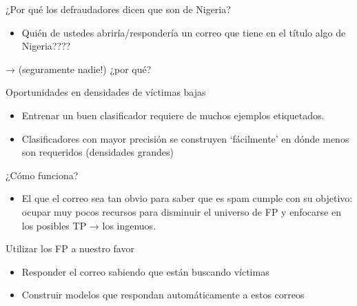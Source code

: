 \documentclass[ignorenonframetext,]{beamer}
\begin{document}
\begin{frame}{¿Por qué los defraudadores dicen que son de Nigeria?}

\begin{itemize}
\itemsep1pt\parskip0pt
\item
  Quién de ustedes abriría/respondería un correo que tiene en el título
  algo de Nigeria????
\end{itemize}

→ (seguramente nadie!) ¿por qué?

\end{frame}

\begin{frame}{Oportunidades en densidades de víctimas bajas}

\begin{itemize}
\item
  Entrenar un buen clasificador requiere de muchos ejemplos etiquetados.
\item
  Clasificadores con mayor precisión se construyen `fácilmente' en dónde
  menos son requeridos (densidades grandes)
\end{itemize}

\end{frame}

\begin{frame}{¿Cómo funciona?}

\begin{itemize}
\itemsep1pt\parskip0pt
\item
  El que el correo sea tan obvio para saber que es spam cumple con su
  objetivo: ocupar muy pocos recursos para disminuir el universo de FP y
  enfocarse en los posibles TP → los ingenuos.
\end{itemize}

\end{frame}

\begin{frame}{Utilizar los FP a nuestro favor}

\begin{itemize}
\item
  Responder el correo sabiendo que están buscando víctimas
\item
  Construir modelos que respondan automáticamente a estos correos
\end{itemize}

\end{frame}
\end{document}
